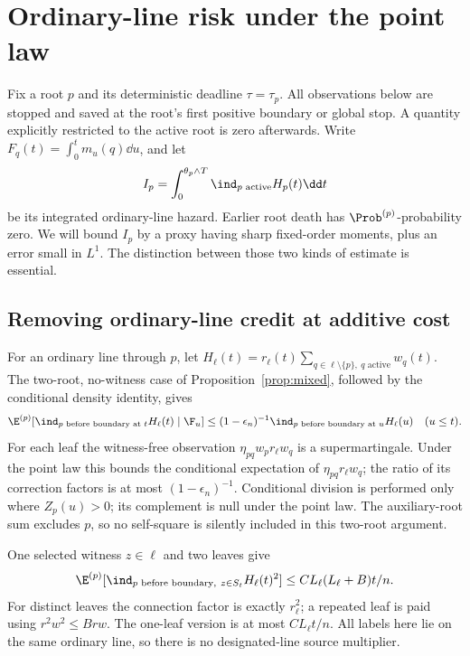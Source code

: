 \section{Ordinary-line risk under the point law}\label{sec:riskproof}

Fix a root \(p\) and its deterministic deadline \(\tau=\tau_p\).
All observations below are stopped and saved at the root's first
positive boundary or global stop. A quantity explicitly restricted
to the active root is zero afterwards. Write
\(F_q(t)=\int_0^t m_u(q)\dd u\), and let
\[
 I_p=\int_0^{\theta_p\wedge T}\ind_{p\text{ active}}H_p(t)\dd t
\]
be its integrated ordinary-line hazard. Earlier root death has
\(\Prob^{(p)}\)-probability zero. We will bound \(I_p\) by a proxy
having sharp fixed-order moments, plus an error small in \(L^1\).
The distinction between those two kinds of estimate is essential.

\subsection{Removing ordinary-line credit at additive cost}
For an ordinary line through \(p\), let
\(H_\ell(t)=r_\ell(t)\sum_{q\in\ell\setminus\{p\},\ q\text{ active}}w_q(t)\).
The two-root, no-witness case of Proposition~\ref{prop:mixed}, followed
by the conditional density identity, gives
\begin{equation}\label{eq:conditionalH}
 \E^{(p)}[\ind_{p\text{ before boundary at }t}H_\ell(t)\mid\F_u]
 \le(1-\epsilon_n)^{-1}
       \ind_{p\text{ before boundary at }u}H_\ell(u)
 \quad(u\le t).
\end{equation}
For each leaf the witness-free observation
\(\eta_{pq}w_pr_\ell w_q\) is a supermartingale. Under the
point law this bounds the conditional expectation of
\(\eta_{pq}r_\ell w_q\); the ratio of its correction factors is
at most \((1-\epsilon_n)^{-1}\). Conditional division is performed only
where \(Z_p(u)>0\); its complement is null under the point law.
The auxiliary-root sum excludes \(p\), so no self-square is
silently included in this two-root argument.

One selected witness \(z\in\ell\) and two leaves give
\begin{equation}\label{eq:secondH}
 \E^{(p)}[\ind_{p\text{ before boundary},\ z\in S_t}H_\ell(t)^2]
 \le C L_\ell(L_\ell+B)t/n.
\end{equation}
For distinct leaves the connection factor is exactly \(r_\ell^2\);
a repeated leaf is paid using \(r^2w^2\le Brw\).
The one-leaf version is at most \(CL_\ell t/n\).
All labels here lie on the same ordinary line, so there is no
designated-line source multiplier.


